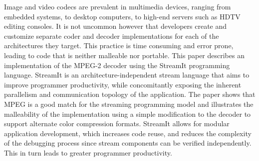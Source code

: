 \vspace{-6pt}
Image and video codecs are prevalent in multimedia devices, ranging
from embedded systems, to desktop computers, to high-end servers such
as HDTV editing consoles. It is not uncommon however that developers
create and customize separate coder and decoder implementations for
each of the architectures they target. This practice is time 
consuming and error prone, leading to
code that is neither malleable nor portable. This paper describes an
implementation of the MPEG-2 decoder using the StreamIt programming
language. StreamIt is an architecture-independent stream language that
aims to improve programmer productivity, while concomitantly exposing
the inherent parallelism and communication topology of the
application. The paper shows that MPEG is a good match for the
streaming programming model and illustrates the malleability of the
implementation using a simple modification to the decoder to support
alternate color compression formats. StreamIt allows for modular
application development, which increases code reuse, and reduces the
complexity of the debugging process since stream components can be
verified independently. This in turn leads to greater programmer
productivity.

